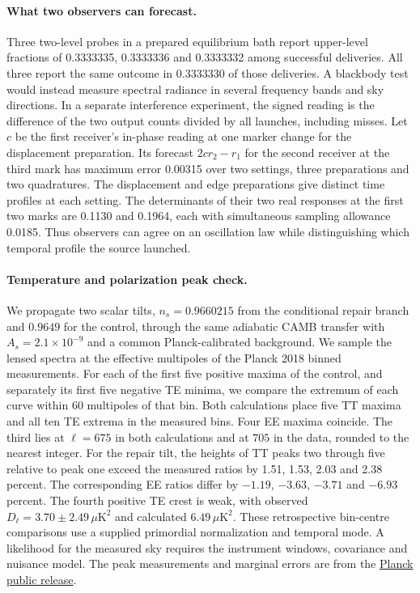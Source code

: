 \documentclass[11pt]{article}
\begin{document}
\paragraph{What two observers can forecast.}
Three two-level probes in a prepared equilibrium bath report upper-level
fractions of 0.3333335, 0.3333336 and 0.3333332 among successful deliveries.
All three report the same outcome in 0.3333330 of those deliveries. A
blackbody test would instead measure spectral radiance in several frequency
bands and sky directions. In a separate interference experiment, the
signed reading is the difference of the two output counts divided by all
launches, including misses. Let $c$ be the first receiver's in-phase
reading at one marker change for the displacement preparation. Its forecast
$2c r_2-r_1$ for the second receiver at the third mark has maximum error
0.00315 over two settings, three preparations and two quadratures.
The displacement and edge preparations give distinct time profiles at each
setting. The determinants of their two real responses at the first two
marks are 0.1130 and 0.1964, each with simultaneous sampling allowance
0.0185. Thus observers can agree on an oscillation law while distinguishing
which temporal profile the source launched.

\paragraph{Temperature and polarization peak check.}
We propagate two scalar tilts, $n_s=0.9660215$ from the conditional repair
branch and $0.9649$ for the control, through the same adiabatic CAMB
transfer with $A_s=2.1\times10^{-9}$ and a common Planck-calibrated
background. We sample the lensed spectra at the effective multipoles of
the Planck 2018 binned measurements. For each of the first five positive
maxima of the control, and separately its first five negative TE minima,
we compare the extremum of each curve within 60 multipoles of that bin.
Both calculations place five TT maxima and all ten TE extrema in the
measured bins. Four EE maxima coincide. The third lies at $\ell=675$ in
both calculations and at $705$ in the data, rounded to the nearest integer.
For the repair tilt, the heights of TT peaks two through five relative to
peak one exceed the measured ratios by 1.51, 1.53, 2.03 and 2.38 percent.
The corresponding EE ratios differ by $-1.19$, $-3.63$, $-3.71$ and
$-6.93$ percent. The fourth positive TE crest is weak, with observed
$D_\ell=3.70\pm2.49\,\mu\mathrm{K}^2$ and calculated
$6.49\,\mu\mathrm{K}^2$. These retrospective bin-centre comparisons use
a supplied primordial normalization and temporal mode. A likelihood for
the measured sky requires the instrument windows, covariance and nuisance
model. The peak measurements and marginal errors are from the
\href{https://irsa.ipac.caltech.edu/data/Planck/release_3/ancillary-data/cosmoparams/}{Planck public release}.
\end{document}
